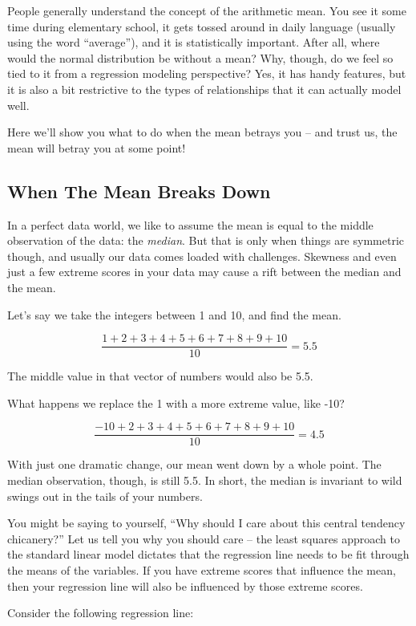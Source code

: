 \documentclass[
  letterpaper,
]{krantz}
\begin{document}
People generally understand the concept of the arithmetic mean. You see
it some time during elementary school, it gets tossed around in daily
language (usually using the word ``average''), and it is statistically
important. After all, where would the normal distribution be without a
mean? Why, though, do we feel so tied to it from a regression modeling
perspective? Yes, it has handy features, but it is also a bit
restrictive to the types of relationships that it can actually model
well.

Here we'll show you what to do when the mean betrays you -- and trust
us, the mean will betray you at some point!

\subsection{When The Mean Breaks Down}\label{sec-quantile-break}

In a perfect data world, we like to assume the mean is equal to the
middle observation of the data: the \emph{median}. But that is only when
things are symmetric though, and usually our data comes loaded with
challenges. Skewness and even just a few extreme scores in your data may
cause a rift between the median and the mean.

Let's say we take the integers between 1 and 10, and find the mean.

\[\frac{1+2+3+4+5+6+7+8+9+10}{10} =  5.5\]

The middle value in that vector of numbers would also be 5.5.

What happens we replace the 1 with a more extreme value, like -10?

\[\frac{-10+2+3+4+5+6+7+8+9+10}{10} =  4.5\]

With just one dramatic change, our mean went down by a whole point. The
median observation, though, is still 5.5. In short, the median is
invariant to wild swings out in the tails of your numbers.

You might be saying to yourself, ``Why should I care about this central
tendency chicanery?'' Let us tell you why you should care -- the least
squares approach to the standard linear model dictates that the
regression line needs to be fit through the means of the variables. If
you have extreme scores that influence the mean, then your regression
line will also be influenced by those extreme scores.

Consider the following regression line:

\begin{figure}[H]


\caption{\label{fig-linear-line-no-extremes}}

\end{figure}%
\end{document}
